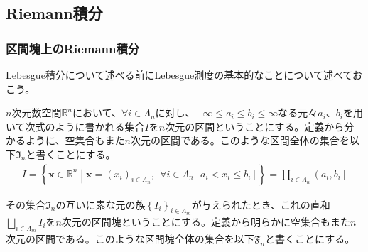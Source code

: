 \documentclass[dvipdfmx]{jsarticle}
\begin{document}
\subsection{Riemann積分}%
\subsubsection{区間塊上のRiemann積分}%
Lebesgue積分について述べる前にLebesgue測度の基本的なことについて述べておこう。
\begin{dfn*}
$n$次元数空間$\mathbb{R}^{n}$において、$\forall i \in \varLambda_{n}$に対し、$- \infty \leq a_{i} \leq b_{i} \leq \infty$なる元々$a_{i}$、$b_{i}$を用いて次式のように書かれる集合$I$を$n$次元の区間ということにする。定義から分かるように、空集合もまた$n$次元の区間である。このような区間全体の集合を以下$\mathfrak{I}_{n}$と書くことにする。
\begin{align*}
I = \left\{ \mathbf{x} \in \mathbb{R}^{n} \middle| \mathbf{x} = \left( x_{i} \right)_{i \in \varLambda_{n}},\ \ \forall i \in \varLambda_{n}\left[ a_{i} < x_{i} \leq b_{i} \right] \right\} = \prod_{i \in \varLambda_{n}} \left( a_{i},b_{i} \right]
\end{align*}
\end{dfn*}
\begin{dfn*}
その集合$\mathfrak{I}_{n}$の互いに素な元の族$\left\{ I_{i} \right\}_{i \in \varLambda_{m} }$が与えられたとき、これの直和$\bigsqcup_{i \in \varLambda_{m} } I_{i}$を$n$次元の区間塊ということにする。定義から明らかに空集合もまた$n$次元の区間である。このような区間塊全体の集合を以下$\mathfrak{F}_{n}$と書くことにする。
\end{dfn*}
\end{document}
